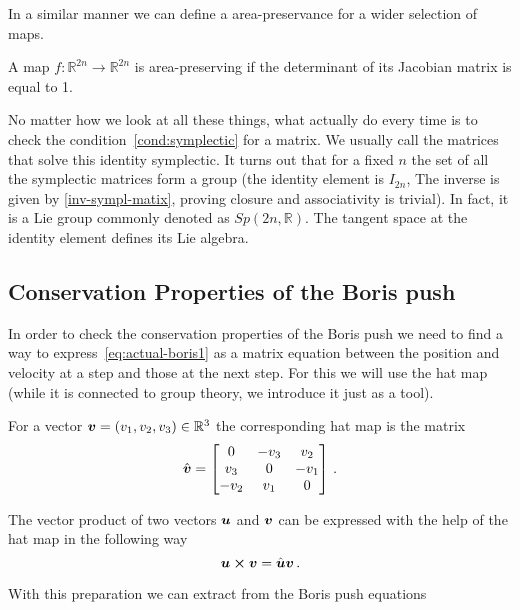 \documentclass[12pt, class=report, crop=false]{standalone}
\begin{document}
In a similar manner we can define a area-preservance for a wider selection of maps.

\begin{definition}
  A map \(f:\mathbb{R}^{2n}\rightarrow \mathbb{R}^{2n}\) is area-preserving if the determinant of its Jacobian matrix is equal to 1.
\end{definition}

No matter how we look at all these things, what actually do every time is to check the condition~\ref{cond:symplectic} for a matrix. We usually call the matrices that solve this identity symplectic. It turns out that for a fixed \(n\) the set of all the symplectic matrices form a group (the identity element is \(I_{2n}\), The inverse is given by \cref{inv-sympl-matix}, proving closure and associativity is trivial). In fact, it is a Lie group commonly denoted as \(Sp(2n,\mathbb{R})\). The tangent space at the identity element defines its Lie algebra.

\subsection{Conservation Properties of the Boris push}

In order to check the conservation properties of the Boris push we need to find a way to express~\cref{eq:actual-boris1} as a matrix equation between the position and velocity at a step and those at the next step. For this we will use the hat map (while it is connected to group theory, we introduce it just as a tool).

\begin{definition}
  For a vector \(\vb*{v} = (v_1, v_2,v_3) \in \mathbb{R}^3\) the corresponding hat map is the matrix
  \[
  \hat{\vb*{v}} =
  \begin{bmatrix}
    0 & -v_3 & v_2 \\
    v_3 & 0 & -v_1\\
    -v_2 & v_1 & 0
  \end{bmatrix}\,.
  \]
\end{definition}

\begin{proposition}
  The vector product of two vectors \(\vb*{u}\) and \(\vb*{v}\) can be expressed with the help of the hat map in the following way
  \[
    \vb*{u}\cp \vb*{v} = \hat{\vb*{u}} \vb*{v}\,.
  \]
\end{proposition}

With this preparation we can extract from the Boris push equations
\end{document}
